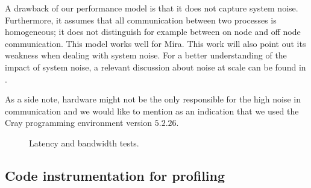 \documentclass{sig-alternate}
\begin{document}
A drawback of our performance model is that it does not capture system
noise. Furthermore, it assumes that all communication between two processes is
homogeneous; it does not distinguish for example between on node and off node
communication. This model works well for Mira. This work will also point out its
weakness when dealing with system noise. For a better understanding
of the impact of system noise, a relevant discussion about noise at 
scale can be found in \cite{Hoefler:2010}.

As a side note, hardware might not be the only responsible for the high noise in
communication and we would like to mention as an indication that we used the Cray 
programming environment version $5.2.26$. 


\begin{figure}
  \centering
  \caption{Latency and bandwidth tests.}
  \label{fig:pingpong}
\end{figure}

\subsection{Code instrumentation for profiling}
\label{sec:timers}
 
\end{document}
